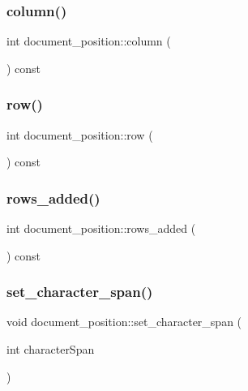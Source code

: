 \subsubsection{\texorpdfstring{column()}{column()}}
{\footnotesize\ttfamily int document\+\_\+position\+::column (\begin{DoxyParamCaption}{ }\end{DoxyParamCaption}) const\hspace{0.3cm}{\ttfamily [inline]}}

\mbox{\label{structdocument__position_a1876acea232279350a461f674d908175}} 
\subsubsection{\texorpdfstring{row()}{row()}}
{\footnotesize\ttfamily int document\+\_\+position\+::row (\begin{DoxyParamCaption}{ }\end{DoxyParamCaption}) const\hspace{0.3cm}{\ttfamily [inline]}}

\mbox{\label{structdocument__position_aac6e8273ee916e655827f19865615819}} 
\subsubsection{\texorpdfstring{rows\_added()}{rows\_added()}}
{\footnotesize\ttfamily int document\+\_\+position\+::rows\+\_\+added (\begin{DoxyParamCaption}{ }\end{DoxyParamCaption}) const\hspace{0.3cm}{\ttfamily [inline]}}

\mbox{\label{structdocument__position_aa83b6505abfd4a91083fc6627e6dbb86}} 
\subsubsection{\texorpdfstring{set\_character\_span()}{set\_character\_span()}}
{\footnotesize\ttfamily void document\+\_\+position\+::set\+\_\+character\+\_\+span (\begin{DoxyParamCaption}\item[{int}]{character\+Span }\end{DoxyParamCaption})\hspace{0.3cm}{\ttfamily [inline]}}

